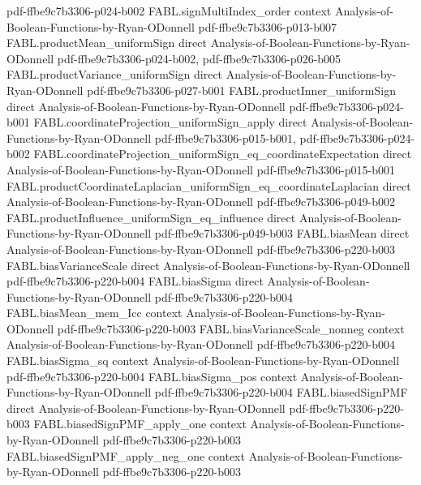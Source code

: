\begin{theorem}
  {pdf-ffbe9c7b3306-p024-b002}
\proofstep
  {FABL.signMultiIndex_order}
  {context}
  {Analysis-of-Boolean-Functions-by-Ryan-ODonnell}
  {pdf-ffbe9c7b3306-p013-b007}
\proofstep
  {FABL.productMean_uniformSign}
  {direct}
  {Analysis-of-Boolean-Functions-by-Ryan-ODonnell}
  {pdf-ffbe9c7b3306-p024-b002,
    pdf-ffbe9c7b3306-p026-b005}
\proofstep
  {FABL.productVariance_uniformSign}
  {direct}
  {Analysis-of-Boolean-Functions-by-Ryan-ODonnell}
  {pdf-ffbe9c7b3306-p027-b001}
\proofstep
  {FABL.productInner_uniformSign}
  {direct}
  {Analysis-of-Boolean-Functions-by-Ryan-ODonnell}
  {pdf-ffbe9c7b3306-p024-b001}
\proofstep
  {FABL.coordinateProjection_uniformSign_apply}
  {direct}
  {Analysis-of-Boolean-Functions-by-Ryan-ODonnell}
  {pdf-ffbe9c7b3306-p015-b001,
    pdf-ffbe9c7b3306-p024-b002}
\proofstep
  {FABL.coordinateProjection_uniformSign_eq_coordinateExpectation}
  {direct}
  {Analysis-of-Boolean-Functions-by-Ryan-ODonnell}
  {pdf-ffbe9c7b3306-p015-b001}
\proofstep
  {FABL.productCoordinateLaplacian_uniformSign_eq_coordinateLaplacian}
  {direct}
  {Analysis-of-Boolean-Functions-by-Ryan-ODonnell}
  {pdf-ffbe9c7b3306-p049-b002}
\proofstep
  {FABL.productInfluence_uniformSign_eq_influence}
  {direct}
  {Analysis-of-Boolean-Functions-by-Ryan-ODonnell}
  {pdf-ffbe9c7b3306-p049-b003}
\proofstep
  {FABL.biasMean}
  {direct}
  {Analysis-of-Boolean-Functions-by-Ryan-ODonnell}
  {pdf-ffbe9c7b3306-p220-b003}
\proofstep
  {FABL.biasVarianceScale}
  {direct}
  {Analysis-of-Boolean-Functions-by-Ryan-ODonnell}
  {pdf-ffbe9c7b3306-p220-b004}
\proofstep
  {FABL.biasSigma}
  {direct}
  {Analysis-of-Boolean-Functions-by-Ryan-ODonnell}
  {pdf-ffbe9c7b3306-p220-b004}
\proofstep
  {FABL.biasMean_mem_Icc}
  {context}
  {Analysis-of-Boolean-Functions-by-Ryan-ODonnell}
  {pdf-ffbe9c7b3306-p220-b003}
\proofstep
  {FABL.biasVarianceScale_nonneg}
  {context}
  {Analysis-of-Boolean-Functions-by-Ryan-ODonnell}
  {pdf-ffbe9c7b3306-p220-b004}
\proofstep
  {FABL.biasSigma_sq}
  {context}
  {Analysis-of-Boolean-Functions-by-Ryan-ODonnell}
  {pdf-ffbe9c7b3306-p220-b004}
\proofstep
  {FABL.biasSigma_pos}
  {context}
  {Analysis-of-Boolean-Functions-by-Ryan-ODonnell}
  {pdf-ffbe9c7b3306-p220-b004}
\proofstep
  {FABL.biasedSignPMF}
  {direct}
  {Analysis-of-Boolean-Functions-by-Ryan-ODonnell}
  {pdf-ffbe9c7b3306-p220-b003}
\proofstep
  {FABL.biasedSignPMF_apply_one}
  {context}
  {Analysis-of-Boolean-Functions-by-Ryan-ODonnell}
  {pdf-ffbe9c7b3306-p220-b003}
\proofstep
  {FABL.biasedSignPMF_apply_neg_one}
  {context}
  {Analysis-of-Boolean-Functions-by-Ryan-ODonnell}
  {pdf-ffbe9c7b3306-p220-b003}

\end{theorem}

